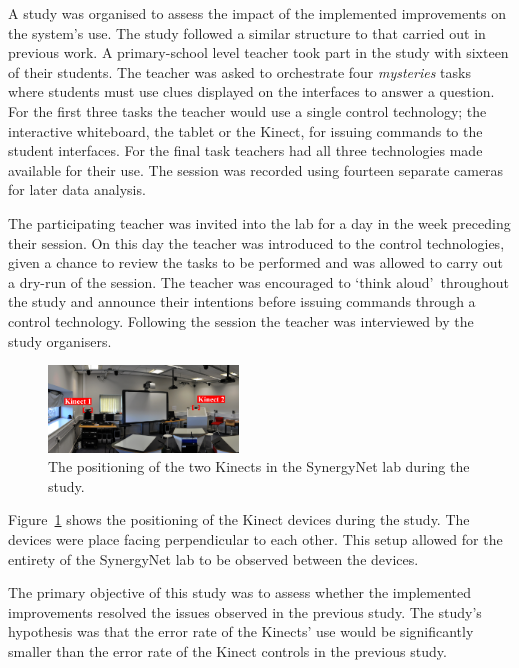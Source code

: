 \documentclass[link]{IWCOMP}
\begin{document}
A study was organised to assess the impact of the implemented improvements on the system's use.
The study followed a similar structure to that carried out in previous work.
A primary-school level teacher took part in the study with sixteen of their students.
The teacher was asked to orchestrate four \textit{mysteries} tasks~\cite{AlAgha2010} where students must use clues displayed on the interfaces to answer a question.
For the first three tasks the teacher would use a single control technology; the interactive whiteboard, the tablet or the Kinect, for issuing commands to the student interfaces.
For the final task teachers had all three technologies made available for their use.
The session was recorded using fourteen separate cameras for later data analysis.

The participating teacher was invited into the lab for a day in the week preceding their session.
On this day the teacher was introduced to the control technologies, given a chance to review the tasks to be performed and was allowed to carry out a dry-run of the session.
The teacher was encouraged to \lq think aloud\rq\ throughout the study and announce their intentions before issuing commands through a control technology.
Following the session the teacher was interviewed by the study organisers.

\begin{figure}[h]
  \centering
  \includegraphics[width=0.45\textwidth]{figures/multiple_kinect_setup.png}
  \caption{The positioning of the two Kinects in the SynergyNet lab during the study.}
  \label{fig:kinectSetup}
\end{figure}

Figure~\ref{fig:kinectSetup} shows the positioning of the Kinect devices during the study.
The devices were place facing perpendicular to each other.
This setup allowed for the entirety of the SynergyNet lab to be observed between the devices.

The primary objective of this study was to assess whether the implemented improvements resolved the issues observed in the previous study.
The study's hypothesis was that the error rate of the Kinects' use would be significantly smaller than the error rate of the Kinect controls in the previous study.
\end{document}
